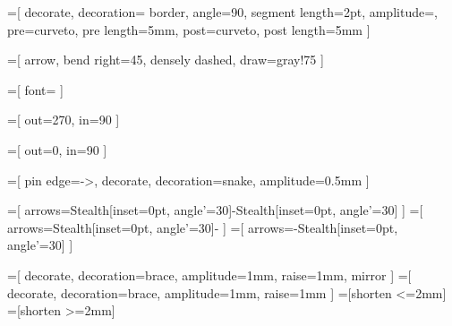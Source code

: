 =[
  decorate,
  decoration={
    border, angle=90, segment length=2pt, amplitude=\pgflinewidth,
    pre=curveto, pre length=5mm, post=curveto, post length=5mm
  }
]

=[
  arrow,
  bend right=45,
  densely dashed,
  draw=gray!75
]

=[
  font=\small
]

=[
  out=270,
  in=90
]

=[
  out=0,
  in=90
]

=[
  pin edge={->, decorate, decoration={snake, amplitude=0.5mm}}
]

=[
  arrows={Stealth[inset=0pt, angle'=30]-Stealth[inset=0pt, angle'=30]}
]
=[
  arrows={Stealth[inset=0pt, angle'=30]-}
]
=[
  arrows={-Stealth[inset=0pt, angle'=30]}
]

\newcommand{\bottommeasure}[4][5mm] {
  \begin{scope}[line width=0.1mm]
    \coordinate (x) at ([yshift=-#1] #3);
    \draw (x) [measure] -- node [label={[label distance=-1mm]above:#2}] {} (x -| #4);
    \draw (#3) -- ++(0, -#1) -- +(0, -1.25mm);
    \draw (#4) -- ++(0, -#1) -- +(0, -1.25mm);
  \end{scope}
}

\newcommand{\rightbottommeasure}[4][5mm] {
\begin{scope}[line width=0.1mm]
  \draw (#3) -- ++(0, -#1) -- ++(0, 1.25mm) coordinate(x);
  \draw (x) [direct measure] -- +(-3mm, 0);
  \draw (#4) -- ++(0, -#1) -- ++(0, 1.25mm) coordinate(x);
  \draw (x) [direct measure] -- node [label={[label distance=-1mm]above:#2}] {} +(8mm, 0);
\end{scope}
}

\newcommand{\topmeasure}[4][5mm] {
  \begin{scope}[line width=0.1mm]
    \coordinate (x) at ([yshift=#1] #3);
    \draw (x) [measure] -- node [label={[label distance=-1mm]above:#2}] {} (x -| #4);
    \draw (#3) -- ++(0, #1) -- +(0, 1.25mm);
    \draw (#4) -- ++(0, #1) -- +(0, 1.25mm);
  \end{scope}
}

=[
  decorate, decoration={brace, amplitude=1mm, raise=1mm, mirror}
]
=[
  decorate, decoration={brace, amplitude=1mm, raise=1mm}
]
=[shorten <=2mm]
=[shorten >=2mm]

\newcommand{\bracetobrace}[4] {
  \coordinate (a) at (#1);
  \coordinate (b) at (#2);
  \coordinate (c) at (#3);
  \coordinate (d) at (#4);
  \draw [bottombrace] (a) -- coordinate (e) (b);
  \draw [topbrace] (c) -- coordinate (f) (d);
  \draw [from brace, to brace, smooth, arrow] (e) to (f);
}

\newcommand{\toppointer}[2] {
  \draw ([yshift=1mm] #1) [Latex-] -- ([yshift=9mm] #1) node [anchor=south] {#2};
}

\newcommand{\param}[1] {
  \texttt{#1}
}

\newcommand{\subparam}[2] {
  \texttt{#1}_{\texttt{\scriptsize #2}}
}
